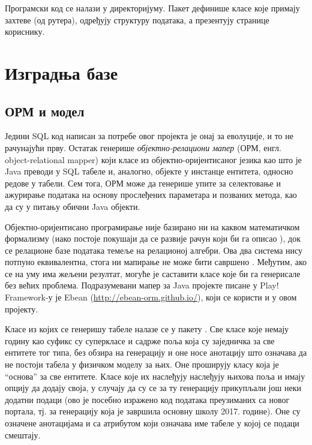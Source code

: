 Програмски код се налази у  директоријуму. Пакет  дефинише класе које примају захтеве (од рутера),  одређују структуру података, а  презентују странице кориснику.



\section{Изградња базе}\label{sec:4.4}

\subsection{ОРМ и модел}

Једини SQL код написан за потребе овог пројекта је онај за еволуције, и то не рачунајући прву. Остатак генерише \emph{објектно-релациони мапер} (ОРМ, енгл. object-relational mapper) који класе из објектно-оријентисаног језика као што је Java преводи у SQL табеле и, аналогно, објекте у инстанце ентитета, односно редове у табели. Сем тога, ОРМ може да генерише упите за селектовање и ажурирање података на основу прослеђених параметара и позваних метода, као да су у питању обични Java објекти. 

Објектно-оријентисано програмирање није базирано ни на каквом математичком формализму (иако постоје покушаји да се развије рачун који би га описао \citep{abadi2012theory}), док се релационе базе података темеље на релационој алгебри. Ова два система нису потпуно еквивалентна, стога ни мапирање не може бити савршено \citep{barnes2007object}. Међутим, ако се на уму има жељени резултат, могуће је саставити класе које би га генерисале без већих проблема. Подразумевани мапер за Java пројекте писане у Play! Framework-у је Ebean (\url{http://ebean-orm.github.io/}), који се користи и у овом пројекту.

Класе из којих се генеришу табеле налазе се у пакету . Све класе које немају годину као суфикс су суперкласе и садрже поља која су заједничка за све ентитете тог типа, без обзира на генерацију и оне носе анотацију  што означава да не постоји табела у физичком моделу за њих. Оне проширују класу  која је \enquote{основа} за све ентитете. Класе које их наслеђују наслеђују њихова поља и имају опцију да додају своја, у случају да су се за ту генерацију прикупљали још неки додатни подаци (ово је посебно изражено код података преузиманих са новог портала, тј. за генерацију која је завршила основну школу 2017. године). Оне су означене анотацијама  и  са атрибутом  који означава име табеле у којој се подаци смештају.


